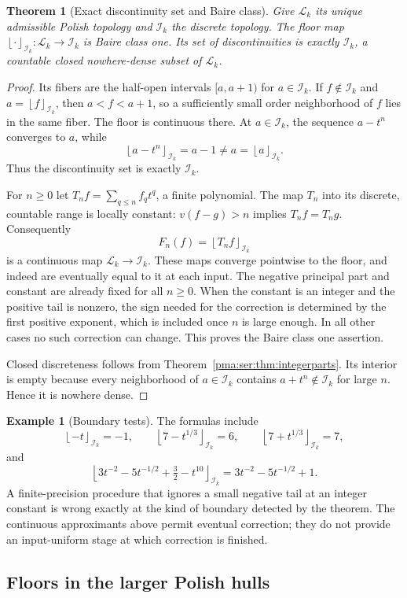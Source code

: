 \documentclass[11pt]{article}
\numberwithin{equation}{section}
\newtheorem{theorem}{Theorem}[section]
\theoremstyle{definition}
\newtheorem{example}[example]{Example}
\theoremstyle{remark}
\newcommand{\Lk}{\mathcal L_k}
\newcommand{\Ik}{\mathcal I_k}
\newcommand{\floorI}[1]{\left\lfloor #1\right\rfloor_{\!\Ik}}
\begin{document}
\begin{theorem}[Exact discontinuity set and Baire class]
\label{pma:ser:thm:floorregularity}
Give $\Lk$ its unique admissible Polish topology and $\Ik$ the discrete
topology. The floor map $\floorI{\cdot}:\Lk\to\Ik$ is Baire class one.
Its set of discontinuities is exactly $\Ik$, a countable closed nowhere-dense
subset of $\Lk$.
\end{theorem}
\begin{proof}
Its fibers are the half-open intervals $[a,a+1)$ for $a\in\Ik$.
If $f\notin\Ik$ and $a=\floorI f$, then $a<f<a+1$, so a sufficiently
small order neighborhood of $f$ lies in the same fiber. The floor is
continuous there. At $a\in\Ik$, the sequence
$a-t^n$ converges to $a$, while
\[
 \floorI{a-t^n}=a-1\ne a=\floorI a.
\]
Thus the discontinuity set is exactly $\Ik$.

For $n\geq0$ let $T_n f=\sum_{q\leq n}f_qt^q$, a finite polynomial.
The map $T_n$ into its discrete, countable range is locally constant:
$v(f-g)>n$ implies $T_nf=T_ng$.
Consequently
\[
 F_n(f)=\floorI{T_nf}
\]
is a continuous map $\Lk\to\Ik$. These maps converge pointwise to the
floor, and indeed are eventually equal to it at each input. The negative
principal part and constant are already fixed for all $n\geq0$.
When the constant is an integer and the positive tail is nonzero, the sign
needed for the correction is determined by the first positive exponent,
which is included once $n$ is large enough. In all other cases no such
correction can change. This proves the Baire class one assertion.

Closed discreteness follows from Theorem~\ref{pma:ser:thm:integerparts}. Its interior
is empty because every neighborhood of $a\in\Ik$ contains
$a+t^n\notin\Ik$ for large $n$. Hence it is nowhere dense.
\end{proof}

\begin{example}[Boundary tests]
The formulas include
\[
 \floorI{-t}=-1,\qquad
 \floorI{7-t^{1/3}}=6,\qquad
 \floorI{7+t^{1/3}}=7,
\]
and
\[
 \floorI{3t^{-2}-5t^{-1/2}+\tfrac32-t^{10}}
   =3t^{-2}-5t^{-1/2}+1.
\]
A finite-precision procedure that ignores a small negative tail at an integer
constant is wrong exactly at the kind of boundary detected by the theorem.
The continuous approximants above permit eventual correction; they do not
provide an input-uniform stage at which correction is finished.
\end{example}

\subsection{Floors in the larger Polish hulls}
\end{document}
